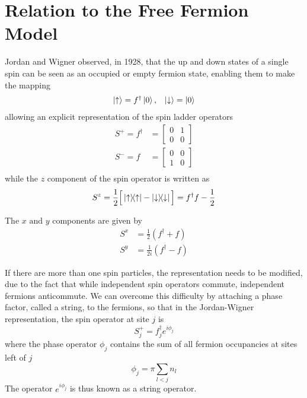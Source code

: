 \documentclass[../intro.tex,../../main.tex]{subfiles}
\begin{document}
\section{Relation to the Free Fermion Model}

Jordan and Wigner\cite{jorwig} observed, in 1928, that the up and down states of a single spin can be seen as an occupied or empty fermion state, enabling them to make the mapping
\begin{equation}
    \begin{array}{cc}
        \ket{\uparrow}=f^{\dagger}\ket{0}, & \ket{\downarrow}=\ket{0} 
    \end{array}
\end{equation}
allowing an explicit representation of the spin ladder operators
\begin{equation}
    \begin{split}
        S^{+} = f^{\dagger} &=\left[\begin{array}{cc}
            0 & 1 \\
            0 & 0
        \end{array}\right]\\
        S^{-} = f &=\left[\begin{array}{cc}
            0 & 0 \\
            1 & 0
        \end{array}\right]\\
    \end{split}
\end{equation}
while the $z$ component of the spin operator is written as
\begin{equation}
    S^{z}=\frac{1}{2}\Big[\ketbra{\uparrow}-\ketbra{\downarrow}\Big]=f^{\dagger}f-\frac{1}{2}
\end{equation}

The $x \text{ and } y$ components are given by
\begin{equation}
\begin{split}
    S^{x}&=\frac{1}{2}(f^{\dagger}+f)\\
    S^{y}&=\frac{1}{2i}(f^{\dagger}-f)
\end{split}
\end{equation}

If there are more than one spin particles, the representation needs to be modified, due to the fact that while independent spin operators commute, independent fermions anticommute. We can overcome this difficulty by attaching a phase factor, called a string, to the fermions, so that in the Jordan-Wigner representation, the spin operator at site $j$ is
\begin{equation}
    S_{j}^{+}=f_{j}^{\dagger}e^{i\phi_{j}}
\end{equation}
where the phase operator $\phi_{j}$ contains the sum of all fermion occupancies at sites left of $j$
\begin{equation}
    \phi_{j}=\pi\sum_{l<j}n_{l}
\end{equation}
The operator $e^{i\phi_{j}}$ is thus known as a string operator.\\
\end{document}

